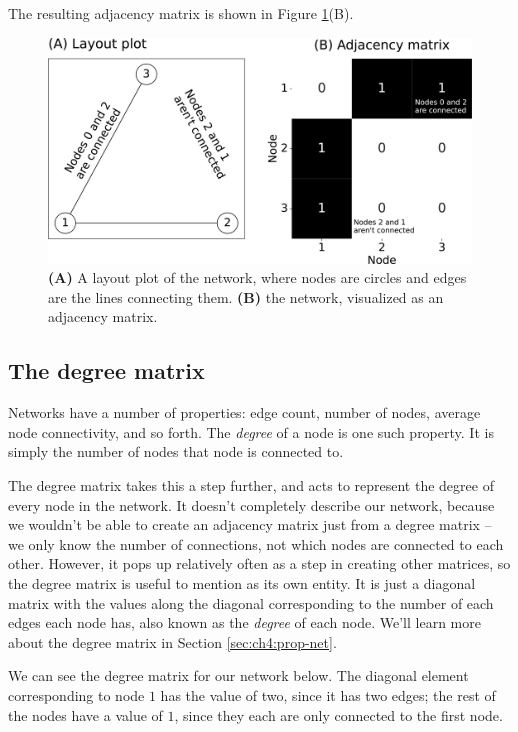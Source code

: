 The resulting adjacency matrix is shown in Figure \ref{fig:ch4:basic_mtxs}(B).

\begin{figure}[h]
    \centering
    \includegraphics[width=0.8\linewidth]{representations/ch4/Images/basic_mtxs.png}
    \caption[Plotting a simple network as a layout plot and adjacency matrix heatmap]{\textbf{(A)} A layout plot of the network, where nodes are circles and edges are the lines connecting them. \textbf{(B)} the network, visualized as an adjacency matrix.}
    \label{fig:ch4:basic_mtxs}
\end{figure}

\subsection{The degree matrix}

Networks have a number of properties: edge count, number of nodes, average node connectivity, and so forth. The \emph{degree} of a node is one such property. It is simply the number of nodes that node is connected to.

The degree matrix takes this a step further, and acts to represent the degree of every node in the network. It doesn't completely describe our network, because we wouldn't be able to create an adjacency matrix just from a degree matrix -- we only know the number of connections, not which nodes are connected to each other. However, it pops up relatively often as a step in creating other matrices, so the degree matrix is useful to mention as its own entity. It is just a diagonal matrix with the values along the diagonal corresponding to the number of each edges each node has, also known as the \textit{degree} of each node. We'll learn more about the degree matrix in Section \ref{sec:ch4:prop-net}.

We can see the degree matrix for our network below. The diagonal element corresponding to node $1$ has the value of two, since it has two edges; the rest of the nodes have a value of $1$, since they each are only connected to the first node.

